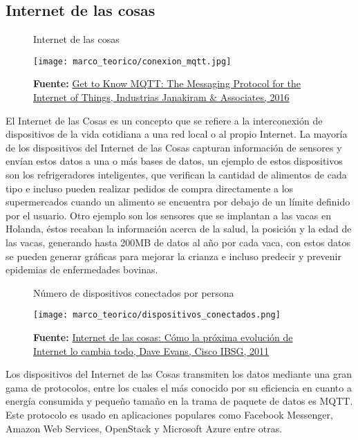 \documentclass[../principal]{subfiles}
\begin{document}
  \subsection{Internet de las cosas}

  \begin{figure}[h]
    \centering
	  \caption{Internet de las cosas}
	  \texttt{[image: marco\_teorico/conexion\_mqtt.jpg]}
	  \caption*{\textbf{Fuente:} \href{https://thenewstack.io/mqtt-protocol-iot/}{Get to Know MQTT: The Messaging Protocol for the Internet of Things, Industrias Janakiram \& Associates, 2016}}
  \end{figure}

  El Internet de las Cosas es un concepto que se refiere a la interconexión de dispositivos de la vida cotidiana a una red local o al propio Internet. La mayoría de los dispositivos del Internet de las Cosas capturan información de sensores y envían estos datos a una o más bases de datos, un ejemplo de estos dispositivos son los refrigeradores inteligentes, que verifican la cantidad de alimentos de cada tipo e incluso pueden realizar pedidos de compra directamente a los supermercados cuando un alimento se encuentra por debajo de un límite definido por el usuario. Otro ejemplo son los sensores que se implantan a las vacas en Holanda, éstos recaban la información acerca de la salud, la posición y la edad de las vacas, generando hasta 200MB de datos al año por cada vaca, con estos datos se pueden generar gráficas para mejorar la crianza e incluso predecir y prevenir epidemias de enfermedades bovinas.\cite{reporte:internet_de_las_cosas}

  \begin{figure}[h]
    \centering
	  \caption{Número de dispositivos conectados por persona}
	  \texttt{[image: marco\_teorico/dispositivos\_conectados.png]}
	  \caption*{\textbf{Fuente:} \href{http://www.cisco.com/c/dam/global/es_mx/solutions/executive/assets/pdf/internet-of-things-iot-ibsg.pdf}{Internet de las cosas: Cómo la próxima evolución de Internet lo cambia todo, Dave Evans, Cisco IBSG, 2011}}
  \end{figure}

  Los dispositivos del Internet de las Cosas transmiten los datos mediante una gran gama de protocolos, entre los cuales el más conocido por su eficiencia en cuanto a energía consumida y pequeño tamaño en la trama de paquete de datos es MQTT. Este protocolo es usado en aplicaciones populares como Facebook Messenger, Amazon Web Services, OpenStack y Microsoft Azure entre otras.\cite{web:mqtt}
\end{document}
